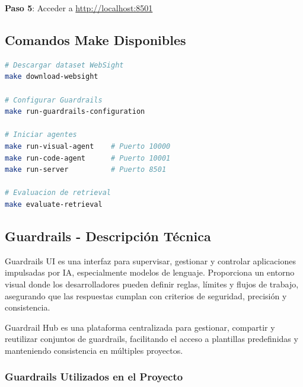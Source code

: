 \documentclass[12pt,a4paper]{article}
\begin{document}
\textbf{Paso 5}: Acceder a \url{http://localhost:8501}

\subsection{Comandos Make Disponibles}

\begin{lstlisting}[language=bash]
# Descargar dataset WebSight
make download-websight

# Configurar Guardrails
make run-guardrails-configuration

# Iniciar agentes
make run-visual-agent    # Puerto 10000
make run-code-agent      # Puerto 10001
make run-server          # Puerto 8501

# Evaluacion de retrieval
make evaluate-retrieval
\end{lstlisting}

\subsection{Guardrails - Descripción Técnica}

Guardrails UI es una interfaz para supervisar, gestionar y controlar aplicaciones impulsadas por IA, especialmente modelos de lenguaje. Proporciona un entorno visual donde los desarrolladores pueden definir reglas, límites y flujos de trabajo, asegurando que las respuestas cumplan con criterios de seguridad, precisión y consistencia.

Guardrail Hub es una plataforma centralizada para gestionar, compartir y reutilizar conjuntos de guardrails, facilitando el acceso a plantillas predefinidas y manteniendo consistencia en múltiples proyectos.
\newpage
\subsubsection{Guardrails Utilizados en el Proyecto}

\setlength\LTleft{0pt}
\setlength\LTright{0pt}
\end{document}
